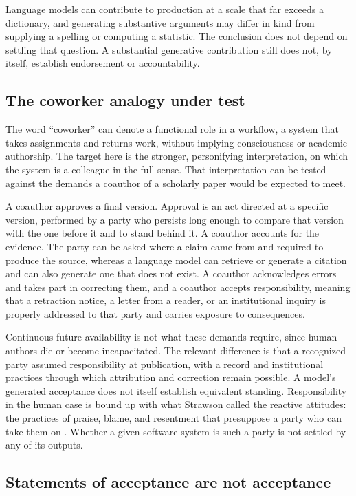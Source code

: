 \documentclass[11pt]{article}
\begin{document}
Language models can contribute to production at a scale that far exceeds a dictionary, and generating substantive arguments may differ in kind from supplying a spelling or computing a statistic. The conclusion does not depend on settling that question. A substantial generative contribution still does not, by itself, establish endorsement or accountability.

\subsection{The coworker analogy under test}

The word ``coworker'' can denote a functional role in a workflow, a system that takes assignments and returns work, without implying consciousness or academic authorship. The target here is the stronger, personifying interpretation, on which the system is a colleague in the full sense. That interpretation can be tested against the demands a coauthor of a scholarly paper would be expected to meet.

A coauthor approves a final version. Approval is an act directed at a specific version, performed by a party who persists long enough to compare that version with the one before it and to stand behind it. A coauthor accounts for the evidence. The party can be asked where a claim came from and required to produce the source, whereas a language model can retrieve or generate a citation and can also generate one that does not exist. A coauthor acknowledges errors and takes part in correcting them, and a coauthor accepts responsibility, meaning that a retraction notice, a letter from a reader, or an institutional inquiry is properly addressed to that party and carries exposure to consequences.

Continuous future availability is not what these demands require, since human authors die or become incapacitated. The relevant difference is that a recognized party assumed responsibility at publication, with a record and institutional practices through which attribution and correction remain possible. A model's generated acceptance does not itself establish equivalent standing. Responsibility in the human case is bound up with what Strawson called the reactive attitudes: the practices of praise, blame, and resentment that presuppose a party who can take them on \cite{strawson1962}. Whether a given software system is such a party is not settled by any of its outputs.

\subsection{Statements of acceptance are not acceptance}
\end{document}
